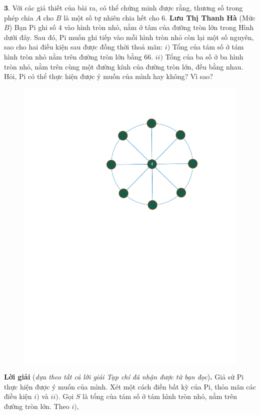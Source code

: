 \begin{multicols}{2}
	$\pmb{3.}$ Với các giả thiết của bài ra, có thể chứng minh được rằng, thương số trong phép chia $A$ cho $B$ là một số tự nhiên chia hết cho $6$.
	\vskip 0.15cm
	\hfill	\textbf{\color{thachthuctoanhoc}Lưu Thị Thanh Hà}
	\vskip 0.15cm
	{}
	(Mức $B$) Bạn Pi ghi số $4$ vào hình tròn nhỏ, nằm ở tâm của đường tròn lớn trong Hình dưới đây. Sau đó, Pi muốn ghi tiếp vào mỗi hình tròn nhỏ còn lại một số nguyên, sao cho hai điều kiện sau được đồng thời thoả mãn: 
	\vskip 0.05cm
	$i)$ Tổng của tám số ở tám hình tròn nhỏ nằm trên đường tròn lớn bằng $66$. 
	\vskip 0.05cm
	$ii)$ Tổng của ba số ở ba hình tròn nhỏ, nằm trên cùng một đường kính của đường tròn lớn, đều bằng nhau. 
	\vskip 0.05cm
	Hỏi, Pi có thể thực hiện được ý muốn của mình hay không? Vì sao?
	\begin{figure}[H]
		\centering
		\vspace*{-10pt}
		\captionsetup{labelformat= empty, justification=centering}
		\includegraphics[width=0.65\linewidth]{P634}
		\vspace*{-10pt}
	\end{figure}
	\textbf{\color{thachthuctoanhoc}Lời giải} (\textit{dựa theo tất cả lời giải Tạp chí đã nhận được từ bạn đọc})\textbf{\color{thachthuctoanhoc}.}
	\vskip 0.05cm
	Giả sử Pi thực hiện được ý muốn của mình.
	\vskip 0.05cm
	Xét một cách điền bất kỳ của Pi, thỏa mãn các điều kiện $i)$ và $ii)$.
	\vskip 0.05cm
	Gọi $S$ là tổng của tám số ở tám hình tròn nhỏ, nằm trên đường tròn lớn. Theo $i)$, 
	\begin{align*}

\end{align*}
\end{multicols}
